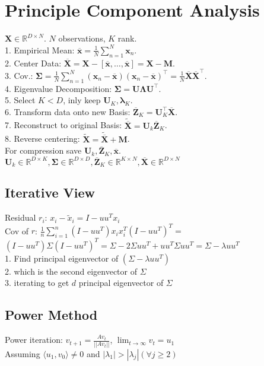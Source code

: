 \section{Principle Component Analysis}
$\mathbf{X} \in \mathbb{R}^{D \times N}$. $N$ observations, $K$ rank.\\
1. Empirical Mean: $\overline{\mathbf{x}} = \frac{1}{N} \sum_{n=1}^N \mathbf{x}_n$.\\
2. Center Data: $\overline{\mathbf{X}} = \mathbf{X} - [\overline{\mathbf{x}}, \ldots, \overline{\mathbf{x}}] = \mathbf{X} - \mathbf{M}$.\\
3. Cov.: $\boldsymbol{\Sigma} = \frac{1}{N	} \sum_{n=1}^N (\mathbf{x}_n - \overline{\mathbf{x}}) (\mathbf{x}_n - \overline{\mathbf{x}})^\top = \frac{1}{N} \overline{\mathbf{X}}\overline{\mathbf{X}}^\top$.\\
4. Eigenvalue Decomposition: $\boldsymbol{\Sigma} = \mathbf{U} \boldsymbol{\Lambda} \mathbf{U}^\top$.\\
5. Select $K < D$, inly keep $\mathbf{U}_K, \boldsymbol{\lambda}_K$.\\
6. Transform data onto new Basis: $\overline{\mathbf{Z}}_K = \mathbf{U}_K^\top \overline{\mathbf{X}}$.\\
7. Reconstruct to original Basis: $\tilde{\overline{\mathbf{X}}} = \mathbf{U}_k \overline{\mathbf{Z}}_K$.\\
8. Reverse centering: $\tilde{\mathbf{X}} = \tilde{\overline{\mathbf{X}}} + \mathbf{M}$.\\
For compression save $\mathbf{U}_k, \overline{\mathbf{Z}}_K, \overline{\mathbf{x}}$.\\
$\mathbf{U}_k \in \mathbb{R}^{D \times K}, \boldsymbol{\Sigma} \in \mathbb{R}^{D \times D}, \overline{\mathbf{Z}}_K \in \mathbb{R}^{K \times N}, \overline{\mathbf{X}} \in \mathbb{R}^{D \times N}$

\subsection*{Iterative View}
Residual $r_i$: $x_i - \tilde{x}_i = I - uu^T  x_i$\\
Cov of $r$:  $\frac{1}{n} \sum_{i=1}^n (I-uu^T)x_i x_i^T (I-uu^T)^T =$ \\
$(I-uu^T) \Sigma (I-uu^T)^T = \Sigma - 2\Sigma u u^T + u u^T \Sigma u u ^T = \Sigma - \lambda uu^T$ \\
1. Find principal eigenvector of $(\Sigma - \lambda u u^T)$\\
2. which is the second eigenvector of $\Sigma$\\
3. iterating to get $d$ principal eigenvector of $\Sigma$

\subsection*{Power Method}
Power iteration: $v_{t+1} = \frac{Av_t}{||Av_t||}$, $\lim_{t \rightarrow \infty} v_t = u_1$\\
Assuming $\langle u_1, v_0 \rangle \not = 0$ and $|\lambda_1| > |\lambda_j| (\forall j \geq 2)$
